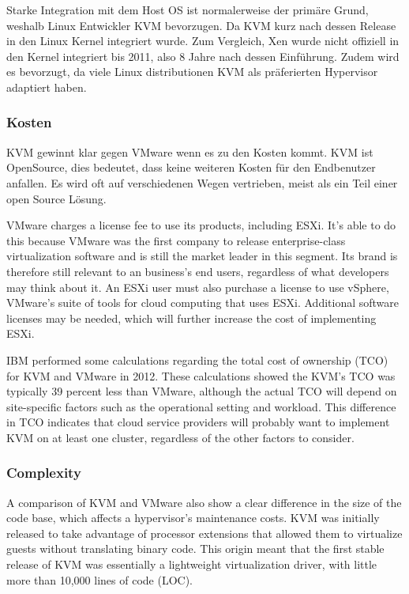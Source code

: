 \documentclass[14pt]{extreport}
\begin{document}
Starke Integration mit dem Host OS ist normalerweise der primäre Grund, weshalb Linux Entwickler KVM bevorzugen. Da KVM kurz nach dessen Release in den Linux Kernel integriert wurde. Zum Vergleich, Xen wurde nicht offiziell in den Kernel integriert bis 2011, also 8 Jahre nach dessen Einführung. Zudem wird es bevorzugt, da viele Linux distributionen KVM als präferierten Hypervisor adaptiert haben.

\subsubsection{Kosten}

KVM gewinnt klar gegen VMware wenn es zu den Kosten kommt. KVM ist OpenSource, dies bedeutet, dass keine weiteren Kosten für den Endbenutzer anfallen. Es wird oft auf verschiedenen Wegen vertrieben, meist als ein Teil einer open Source Lösung.

VMware charges a license fee to use its products, including ESXi. It’s able to do this because VMware was the first company to release enterprise-class virtualization software and is still the market leader in this segment. Its brand is therefore still relevant to an business’s end users, regardless of what developers may think about it. An ESXi user must also purchase a license to use vSphere, VMware’s suite of tools for cloud computing that uses ESXi. Additional software licenses may be needed, which will further increase the cost of implementing ESXi.

IBM performed some calculations regarding the total cost of ownership (TCO) for KVM and VMware in 2012. These calculations showed the KVM’s TCO was typically 39 percent less than VMware, although the actual TCO will depend on site-specific factors such as the operational setting and workload. This difference in TCO indicates that cloud service providers will probably want to implement KVM on at least one cluster, regardless of the other factors to consider.
\subsubsection{Complexity}

A comparison of KVM and VMware also show a clear difference in the size of the code base, which affects a hypervisor’s maintenance costs. KVM was initially released to take advantage of processor extensions that allowed them to virtualize guests without translating binary code. This origin meant that the first stable release of KVM was essentially a lightweight virtualization driver, with little more than 10,000 lines of code (LOC).
\end{document}
